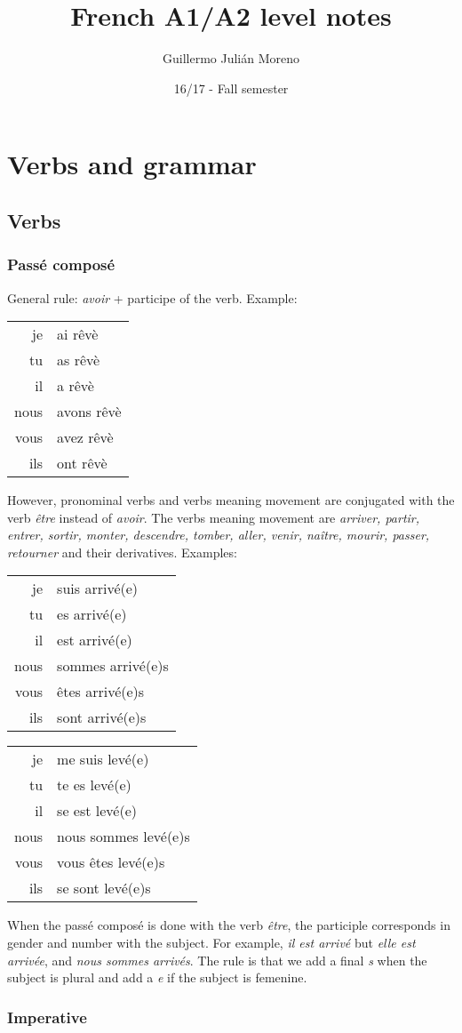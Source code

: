 \documentclass[palatino]{nicenotes}
\title{French A1/A2 level notes}
\author{Guillermo Julián Moreno}
\date{16/17 - Fall semester}
\newcommand{\conjug}[6]{\begin{tabular}{rl}
je & #1 \\
tu & #2 \\
il & #3 \\
nous & #4 \\
vous & #5 \\
ils & #6 \\
\end{tabular}}
\begin{document}
\frontmatter
\pagestyle{plain}
\maketitle

\tableofcontents
\mainmatter


\chapter{Verbs and grammar}

\section{Verbs}

\subsection{Passé composé}

General rule: \textit{avoir} + participe of the verb. Example:

\conjug
	{ai rêvè}
	{as rêvè}
	{a rêvè}
	{avons rêvè}
	{avez rêvè}
	{ont rêvè}

However, pronominal verbs and verbs meaning movement are conjugated with the verb \textit{être} instead of \textit{avoir}. The verbs meaning movement are \textit{arriver, partir, entrer, sortir, monter, descendre, tomber, aller, venir, naître, mourir, passer, retourner} and their derivatives. Examples:


\begin{minipage}{0.45\textwidth}
\centering
\conjug
	{suis arrivé(e)}
	{es arrivé(e)}
	{est arrivé(e)}
	{sommes arrivé(e)s}
	{êtes arrivé(e)s}
	{sont arrivé(e)s}
\end{minipage}
\begin{minipage}{0.45\textwidth}
\centering
\conjug
	{me suis levé(e)}
	{te es levé(e)}
	{se est levé(e)}
	{nous sommes levé(e)s}
	{vous êtes levé(e)s}
	{se sont levé(e)s}
\end{minipage}

When the passé composé is done with the verb \textit{être}, the participle corresponds in gender and number with the subject. For example, \textit{il est arrivé} but \textit{elle est arrivée}, and \textit{nous sommes arrivés}. The rule is that we add a final \textit{s} when the subject is plural and add a \textit{e} if the subject is femenine.

\subsection{Imperative}
\end{document}
